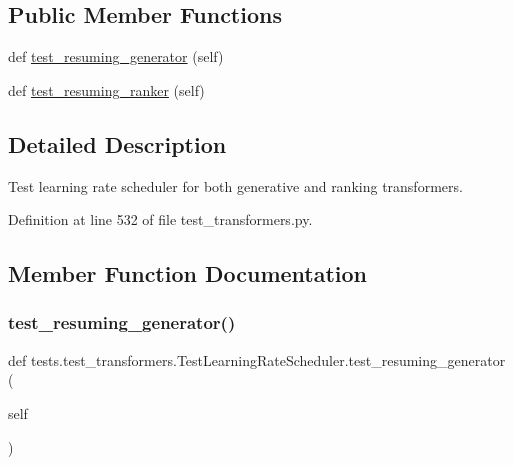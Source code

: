 \subsection*{Public Member Functions}
\begin{DoxyCompactItemize}
\item 
def \hyperlink{classtests_1_1test__transformers_1_1TestLearningRateScheduler_a8c89a354321034bd5717b8e1907cbfeb}{test\+\_\+resuming\+\_\+generator} (self)
\item 
def \hyperlink{classtests_1_1test__transformers_1_1TestLearningRateScheduler_a1f6f7d394258d2170c3005e6dffae8a7}{test\+\_\+resuming\+\_\+ranker} (self)
\end{DoxyCompactItemize}


\subsection{Detailed Description}
\begin{DoxyVerb}Test learning rate scheduler for both generative and ranking transformers.\end{DoxyVerb}
 

Definition at line 532 of file test\+\_\+transformers.\+py.



\subsection{Member Function Documentation}
\mbox{\label{classtests_1_1test__transformers_1_1TestLearningRateScheduler_a8c89a354321034bd5717b8e1907cbfeb}} 
\subsubsection{\texorpdfstring{test\+\_\+resuming\+\_\+generator()}{test\_resuming\_generator()}}
{\footnotesize\ttfamily def tests.\+test\+\_\+transformers.\+Test\+Learning\+Rate\+Scheduler.\+test\+\_\+resuming\+\_\+generator (\begin{DoxyParamCaption}\item[{}]{self }\end{DoxyParamCaption})}

